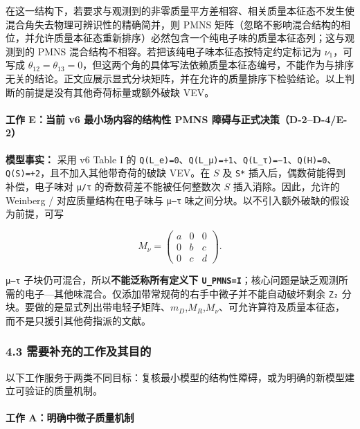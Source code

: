 \documentclass[
]{article}
\begin{document}
在这一结构下，若要求与观测到的非零质量平方差相容、相关质量本征态不发生使混合角失去物理可辨识性的精确简并，则
PMNS
矩阵（忽略不影响混合结构的相位，并允许质量本征态重新排序）必然包含一个纯电子味的质量本征态列；这与观测到的
PMNS 混合结构不相容。若把该纯电子味本征态按特定约定标记为
\(\nu_1\)，可写成
\(\theta_{12}=\theta_{13}=0\)，但这两个角的具体写法依赖质量本征态编号，不能作为与排序无关的结论。正文应展示显式分块矩阵，并在允许的质量排序下检验结论。以上判断的前提是没有其他奇荷标量或额外破缺
VEV。

\paragraph{工作 E：当前 v6 最小场内容的结构性 PMNS
障碍与正式决策（D-2--D-4/E-2）}\label{ux5de5ux4f5c-eux5f53ux524d-v6-ux6700ux5c0fux573aux5185ux5bb9ux7684ux7ed3ux6784ux6027-pmns-ux969cux788dux4e0eux6b63ux5f0fux51b3ux7b56d-2d-4e-2}

\textbf{模型事实：} 采用 v6 Table I 的
\texttt{Q(L\_e)=0}、\texttt{Q(L\_μ)=+1}、\texttt{Q(L\_τ)=−1}、\texttt{Q(H)=0}、\texttt{Q(S)=+2}，且不加入其他带奇荷的破缺
VEV。在 \(S\) 及 \texttt{S*} 插入后，偶数荷能得到补偿，电子味对
\texttt{μ/τ} 的奇数荷差不能被任何整数次 \(S\) 插入消除。因此，允许的
Weinberg / 对应质量结构在电子味与 \texttt{μ–τ}
味之间分块。以不引入额外破缺的假设为前提，可写

\[
 M_\nu=\begin{pmatrix}a&0&0\\0&b&c\\0&c&d\end{pmatrix}.
\]

\texttt{μ–τ} 子块仍可混合，所以\textbf{不能泛称所有定义下
\texttt{U\_PMNS=I}}；核心问题是缺乏观测所需的电子---其他味混合。仅添加带常规荷的右手中微子并不能自动破坏剩余
\texttt{Z₂}
分块。要做的是显式列出带电轻子矩阵、\(m_D\),\(M_R\),\(M_\nu\)、可允许算符及质量本征态，而不是只援引其他荷指派的文献。

\subsubsection{4.3
需要补充的工作及其目的}\label{ux9700ux8981ux8865ux5145ux7684ux5de5ux4f5cux53caux5176ux76eeux7684-2}

以下工作服务于两类不同目标：复核最小模型的结构性障碍，或为明确的新模型建立可验证的质量机制。

\paragraph{工作
A：明确中微子质量机制}\label{ux5de5ux4f5c-aux660eux786eux4e2dux5faeux5b50ux8d28ux91cfux673aux5236}
\end{document}
